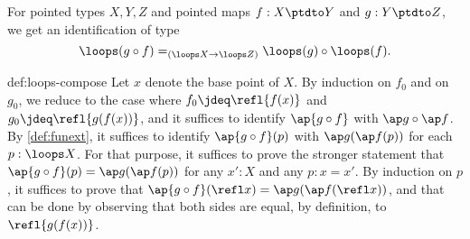 \begin{construction}\label{def:loops-compose}
  For pointed types $X,Y,Z$ and pointed maps $f : X \ptdto Y$
  and $g : Y \ptdto Z$, we get an identification of type
  \[
    \loops(g \circ f) =_{(\loops X \to \loops Z)}
    \loops(g) \circ \loops(f).
  \]
\end{construction}

\begin{implementation}{def:loops-compose}
  Let $x$ denote the base point of $X$.
  By induction on $f_0$ and on $g_0$, we reduce to the case where $f_0 \jdeq \refl{f(x)}$
  and $g_0 \jdeq \refl{g(f(x))}$, and it suffices to identify $\ap{g \circ f}$ with $\ap g \circ \ap f$.
  By \cref{def:funext}, it suffices to identify $\ap{g \circ f}(p)$ with $\ap g ( \ap f (p))$ for each $p : \loops X$.
  For that purpose, it suffices to prove the stronger statement that $\ap{g \circ f}(p) = \ap g ( \ap f (p))$ for any $x' : X$ and any $p : x = x'$.
  By induction on $p$, it suffices to prove that $\ap{g \circ f}(\refl x) = \ap g ( \ap f (\refl x))$, and that can
  be done by observing that both sides are equal, by definition, to $\refl{g(f(x))}$.
\end{implementation}

